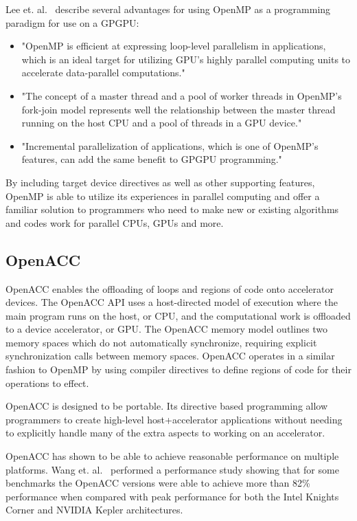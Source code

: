 Lee et. al.~\cite{lee2009openmp} describe several advantages for using OpenMP as a programming paradigm for use on a GPGPU:
\begin{itemize}
\item "OpenMP is efficient at expressing loop-level parallelism in applications, which is an ideal target for utilizing GPU's highly parallel computing units to accelerate data-parallel computations."
\item "The concept of a master thread and a pool of worker threads in OpenMP's fork-join model represents well the relationship between the master thread running on the host CPU and a pool of threads in a GPU device."
\item "Incremental parallelization of applications, which is one of OpenMP's features, can add the same benefit to GPGPU programming."~\cite{lee2009openmp}
\end{itemize}

By including target device directives as well as other supporting features, OpenMP is able to utilize its experiences in parallel computing and offer a familiar solution to programmers who need to make new or existing algorithms and codes work for parallel CPUs, GPUs and more.
\cite{ayguade2010extending}

\subsection*{\textbf{OpenACC}}

OpenACC enables the offloading of loops and regions of code onto accelerator devices.
%
The OpenACC API uses a host-directed model of execution where the main program runs on the host, or CPU, and the computational work is offloaded to a device accelerator, or GPU.
%
The OpenACC memory model outlines two memory spaces which do not automatically synchronize, requiring explicit synchronization calls between memory spaces.
%
OpenACC operates in a similar fashion to OpenMP by using compiler directives to define regions of code for their operations to effect.
\cite{wienke2012openacc}

OpenACC is designed to be portable.
%
Its directive based programming allow programmers to create high-level host+accelerator applications without needing to explicitly handle many of the extra aspects to working on an accelerator.
\cite{openacc}

OpenACC has shown to be able to achieve reasonable performance on multiple platforms.
%
Wang et. al.~\cite{wang2013performance} performed a performance study showing that for some benchmarks the OpenACC versions were able to achieve more than 82\% performance when compared with peak performance for both the Intel Knights Corner and NVIDIA Kepler architectures.

